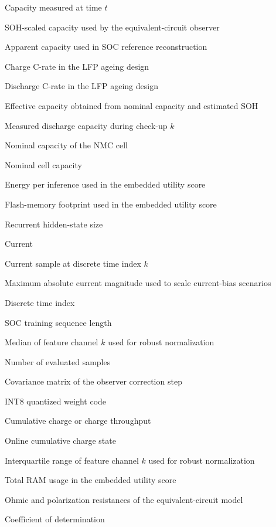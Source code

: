 \documentclass[
    a4paper,
    12pt,
    titlepage,
    bibliography=totoc,
    twoside=on,
    parskip=false,
    numbers=noenddot,
    cleardoublepage=empty,
    DIV=12,
    BCOR=12.0mm,
    headheight=36pt,
    headings=openright
]{scrreprt}
\begin{document}
\begin{description}[style=nextline,leftmargin=3.2cm]
\item[$C(t)$] Capacity measured at time $t$
\item[$C_b$] SOH-scaled capacity used by the equivalent-circuit observer
\item[$C_\mathrm{app}$] Apparent capacity used in SOC reference reconstruction
\item[$C_\mathrm{chg}$] Charge C-rate in the LFP ageing design
\item[$C_\mathrm{dis}$] Discharge C-rate in the LFP ageing design
\item[$C_\mathrm{eff}$] Effective capacity obtained from nominal capacity and estimated SOH
\item[$C_k$] Measured discharge capacity during check-up $k$
\item[$C_\mathrm{N}$] Nominal capacity of the NMC cell
\item[$C_\mathrm{nom}$] Nominal cell capacity
\item[$E$] Energy per inference used in the embedded utility score
\item[$F$] Flash-memory footprint used in the embedded utility score
\item[$H$] Recurrent hidden-state size
\item[$I$] Current
\item[$I_k$] Current sample at discrete time index $k$
\item[$|I|_{\max}$] Maximum absolute current magnitude used to scale current-bias scenarios
\item[$k$] Discrete time index
\item[$L_\mathrm{SOC}$] SOC training sequence length
\item[$m_k$] Median of feature channel $k$ used for robust normalization
\item[$n$] Number of evaluated samples
\item[$P$] Covariance matrix of the observer correction step
\item[$q$] INT8 quantized weight code
\item[$Q$] Cumulative charge or charge throughput
\item[$Q_c$] Online cumulative charge state
\item[$r_k$] Interquartile range of feature channel $k$ used for robust normalization
\item[$R$] Total RAM usage in the embedded utility score
\item[$R_0,R_1,R_2$] Ohmic and polarization resistances of the equivalent-circuit model
\item[$R^2$] Coefficient of determination

\end{description}
\end{document}
